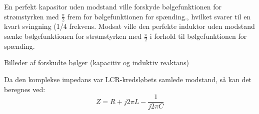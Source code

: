 En perfekt kapasitor uden modstand ville forskyde bølgefunktionen for strømstyrken med $\frac{\pi}{2}$ frem for bølgefunktionen for spænding., hvilket svarer til en kvart svingning (1/4 frekvens. Modsat ville den perfekte induktor uden modstand sænke bølgefunktionen for strømstyrken med $\frac{\pi}{2}$ i forhold til bølgefunktionen for spænding.

Billeder af forskudte bølger (kapacitiv og induktiv reaktans)

Da den komplekse impedans var LCR-kredsløbets samlede modstand, så kan det beregnes ved:
\begin{equation}
Z = R + j 2 \pi L - \frac{1}{j 2 \pi C}
\end{equation}

